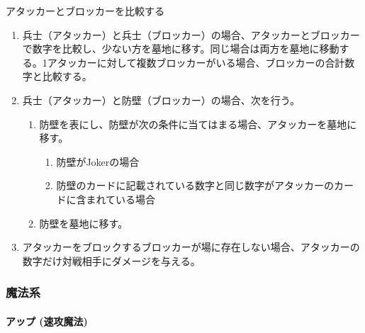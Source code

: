 \documentclass[letterpaper,10pt,dvipdfmx]{sphinxmanual}
\begin{document}
\sphinxAtStartPar
アタッカーとブロッカーを比較する
\begin{enumerate}
%
\item {} 
\sphinxAtStartPar
兵士（アタッカー）と兵士（ブロッカー）の場合、アタッカーとブロッカーで数字を比較し、少ない方を墓地に移す。同じ場合は両方を墓地に移動する。1アタッカーに対して複数ブロッカーがいる場合、ブロッカーの合計数字と比較する。

\item {} 
\sphinxAtStartPar
兵士（アタッカー）と防壁（ブロッカー）の場合、次を行う。
\begin{enumerate}
%
\item {} 
\sphinxAtStartPar
防壁を表にし、防壁が次の条件に当てはまる場合、アタッカーを墓地に移す。
\begin{enumerate}
%
\item {} 
\sphinxAtStartPar
防壁がJokerの場合

\item {} 
\sphinxAtStartPar
防壁のカードに記載されている数字と同じ数字がアタッカーのカードに含まれている場合

\end{enumerate}

\item {} 
\sphinxAtStartPar
防壁を墓地に移す。

\end{enumerate}

\item {} 
\sphinxAtStartPar
アタッカーをブロックするブロッカーが場に存在しない場合、アタッカーの数字だけ対戦相手にダメージを与える。

\end{enumerate}


\subsubsection{魔法系}
\label{\detokenize{auto/actionlist:id19}}

\paragraph{アップ (速攻魔法)}
\label{\detokenize{auto/actionlist:act-up}}\label{\detokenize{auto/actionlist:id20}}
\sphinxAtStartPar
{}
\end{document}
